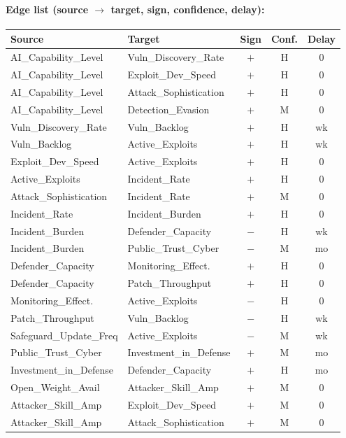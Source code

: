 \documentclass[11pt]{article}
\begin{document}
\paragraph{Edge list (source $\to$ target, sign, confidence, delay):}

\begin{longtable}{@{}p{4.5cm}p{4.5cm}ccc@{}}
\toprule
\textbf{Source} & \textbf{Target} & \textbf{Sign} & \textbf{Conf.} & \textbf{Delay} \\
\midrule
\endhead
AI\_Capability\_Level & Vuln\_Discovery\_Rate & $+$ & H & 0 \\
AI\_Capability\_Level & Exploit\_Dev\_Speed & $+$ & H & 0 \\
AI\_Capability\_Level & Attack\_Sophistication & $+$ & H & 0 \\
AI\_Capability\_Level & Detection\_Evasion & $+$ & M & 0 \\
Vuln\_Discovery\_Rate & Vuln\_Backlog & $+$ & H & wk \\
Vuln\_Backlog & Active\_Exploits & $+$ & H & wk \\
Exploit\_Dev\_Speed & Active\_Exploits & $+$ & H & 0 \\
Active\_Exploits & Incident\_Rate & $+$ & H & 0 \\
Attack\_Sophistication & Incident\_Rate & $+$ & M & 0 \\
Incident\_Rate & Incident\_Burden & $+$ & H & 0 \\
Incident\_Burden & Defender\_Capacity & $-$ & H & wk \\
Incident\_Burden & Public\_Trust\_Cyber & $-$ & M & mo \\
Defender\_Capacity & Monitoring\_Effect. & $+$ & H & 0 \\
Defender\_Capacity & Patch\_Throughput & $+$ & H & 0 \\
Monitoring\_Effect. & Active\_Exploits & $-$ & H & 0 \\
Patch\_Throughput & Vuln\_Backlog & $-$ & H & wk \\
Safeguard\_Update\_Freq & Active\_Exploits & $-$ & M & wk \\
Public\_Trust\_Cyber & Investment\_in\_Defense & $+$ & M & mo \\
Investment\_in\_Defense & Defender\_Capacity & $+$ & H & mo \\
Open\_Weight\_Avail & Attacker\_Skill\_Amp & $+$ & M & 0 \\
Attacker\_Skill\_Amp & Exploit\_Dev\_Speed & $+$ & M & 0 \\
Attacker\_Skill\_Amp & Attack\_Sophistication & $+$ & M & 0 \\

\end{longtable}
\end{document}

